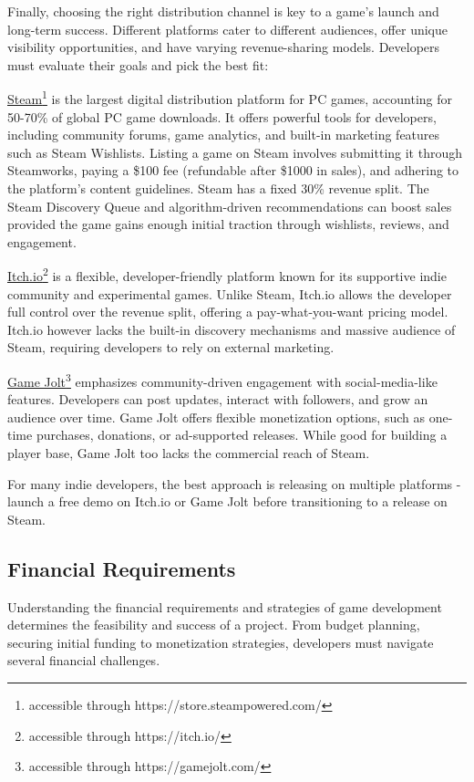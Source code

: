 Finally, choosing the right distribution channel is key to a game’s launch and long-term success. Different platforms cater to different audiences, offer unique visibility opportunities, and have varying revenue-sharing models. Developers must evaluate their goals and pick the best fit:

 \href{https://store.steampowered.com/}{Steam}\footnote{accessible through https://store.steampowered.com/} is the largest digital distribution platform for PC games, accounting for 50-70\% of global PC game downloads.\cite{zuckerman_steam-statistics} It offers powerful tools for developers, including community forums, game analytics, and built-in marketing features such as Steam Wishlists. Listing a game on Steam involves submitting it through Steamworks, paying a \$100 fee (refundable after \$1000 in sales), and adhering to the platform’s content guidelines. Steam has a fixed 30\% revenue split. The Steam Discovery Queue and algorithm-driven recommendations can boost sales provided the game gains enough initial traction through wishlists, reviews, and engagement.\cite{steam_wishlist,steam_partner-program,steam_discovery}

 \href{https://itch.io/}{Itch.io}\footnote{accessible through https://itch.io/} is a flexible, developer-friendly platform known for its supportive indie community and experimental games. Unlike Steam, Itch.io allows the developer full control over the revenue split, offering a pay-what-you-want pricing model. Itch.io however lacks the built-in discovery mechanisms and massive audience of Steam, requiring developers to rely on external marketing.\cite{carpenter_creator-day}

 \href{https://gamejolt.com/}{Game Jolt}\footnote{accessible through https://gamejolt.com/} emphasizes community-driven engagement with social-media-like features. Developers can post updates, interact with followers, and grow an audience over time. Game Jolt offers flexible monetization options, such as one-time purchases, donations, or ad-supported releases. While good for building a player base, Game Jolt too lacks the commercial reach of Steam.\cite{game-jolt_help}

For many indie developers, the best approach is releasing on multiple platforms - launch a free demo on Itch.io or Game Jolt before transitioning to a release on Steam.

\subsection{Financial Requirements}
Understanding the financial requirements and strategies of game development determines the feasibility and success of a project. From budget planning, securing initial funding to monetization strategies, developers must navigate several financial challenges.

